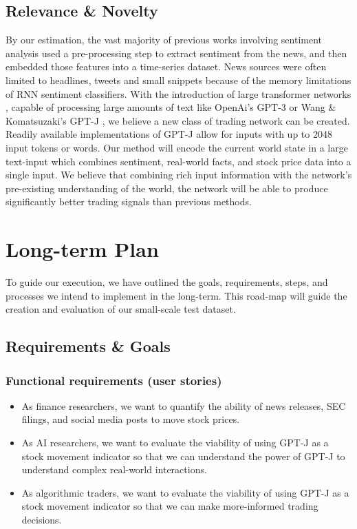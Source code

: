 \documentclass[conference]{IEEEtran}
\begin{document}
\subsection{Relevance \& Novelty}
By our estimation, the vast majority of previous works involving sentiment analysis used a pre-processing step to extract sentiment from the news, and then embedded those features into a time-series dataset. News sources were often limited to headlines, tweets and small snippets because of the memory limitations of RNN sentiment classifiers. With the introduction of large transformer networks \cite{Vaswani2017}, capable of processing large amounts of text like OpenAi's GPT-3 \cite{Brown2020} or Wang \& Komatsuzaki's GPT-J \cite{gpt-j}, we believe a new class of trading network can be created. Readily available implementations of GPT-J allow for inputs with up to 2048 input tokens or words. Our method will encode the current world state in a large text-input which combines sentiment, real-world facts, and stock price data into a single input. We believe that combining rich input information with the network's pre-existing understanding of the world, the network will be able to produce significantly better trading signals than previous methods.

\section{Long-term Plan}
To guide our execution, we have outlined the goals, requirements, steps, and processes we intend to implement in the long-term. This road-map will guide the creation and evaluation of our small-scale test dataset.
\subsection{Requirements \& Goals}
\subsubsection{Functional requirements (user stories)}
\begin{itemize}
	\item As finance researchers, we want to quantify the ability of news releases, SEC filings, and social media posts to move stock prices.
	\item As AI researchers, we want to evaluate the viability of using GPT-J as a stock movement indicator so that we can understand the power of GPT-J to understand complex real-world interactions.
	\item As algorithmic traders, we want to evaluate the viability of using GPT-J as a stock movement indicator so that we can make more-informed trading decisions.
\end{itemize}
\end{document}
